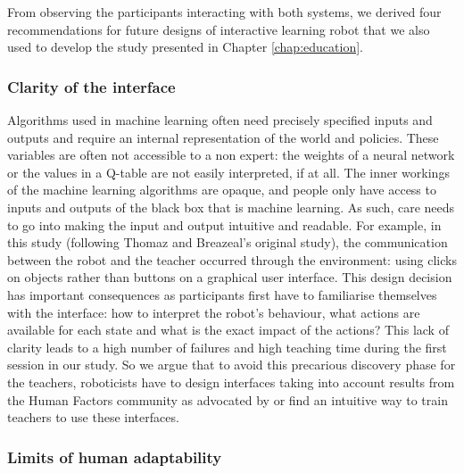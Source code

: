 From observing the participants interacting with both systems, we derived four recommendations for future designs of interactive learning robot that we also used to develop the study presented in Chapter \ref{chap:education}. 

\subsubsection{Clarity of the interface}

Algorithms used in machine learning often need precisely specified inputs and outputs and require an internal representation of the world and policies. These variables are often not accessible to a non expert: the weights of a neural network or the values in a Q-table are not easily interpreted, if at all. The inner workings of the machine learning algorithms are opaque, and people only have access to inputs and outputs of the black box that is machine learning. As such, care needs to go into making the input and output intuitive and readable. For example, in this study (following Thomaz and Breazeal's original study), the communication between the robot and the teacher occurred through the environment: using clicks on objects rather than buttons on a graphical user interface. This design decision has important consequences as participants first have to familiarise themselves with the interface: how to interpret the robot's behaviour, what actions are available for each state and what is the exact impact of the actions? This lack of clarity leads to a high number of failures and high teaching time during the first session in our study. So we argue that to avoid this precarious discovery phase for the teachers, roboticists have to design interfaces taking into account results from the Human Factors community as advocated by \cite{adams2002critical} or find an intuitive way to train teachers to use these interfaces.

\subsubsection{Limits of human adaptability}

